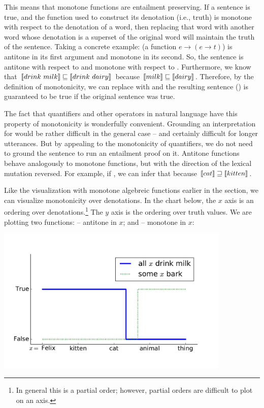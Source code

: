 This means that monotone functions are entailment preserving.
If a sentence is true, and the function used to construct its denotation (i.e., truth)
  is monotone with respect to the denotation of a word, then replacing that word with
  another word whose denotation is a superset of the original word will maintain
  the truth of the sentence.
Taking a concrete example:  (a function $e \rightarrow (e \rightarrow t)$)
  is antitone in its first argument and monotone in its second.
So, the sentence  is antitone with respect to  and
  monotone with respect to .
Furthermore, we know that 
  $\llbracket drink ~ milk\rrbracket \sqsubseteq \llbracket drink~dairy\rrbracket$
  because $\llbracket milk\rrbracket \sqsubseteq \llbracket dairy\rrbracket$.
Therefore, by the definition of monotonicity, we can replace  with
   and the resulting sentence ()
  is guaranteed to be true if the original sentence was true.

The fact that quantifiers and other operators in natural language have this
  property of monotonicity is wonderfully convenient.
Grounding an interpretation for  would be rather
  difficult in the general case -- and certainly difficult for longer utterances.
But by appealing to the monotonicity of quantifiers, we do not need to ground
  the sentence to run an entailment proof on it.
Antitone functions behave analogously to monotone functions, but with the 
  direction of the lexical mutation reversed.
For example, if , we can infer that 
   because 
  $\llbracket cat \rrbracket \sqsupseteq \llbracket kitten\rrbracket$.

Like the visualization with monotone algebreic functions earlier in the section,
  we can visualize monotonicity over denotations.
In the chart below, the $x$ axis is an ordering over denotations.\footnote{
    In general this is a partial order; however, partial orders are difficult
    to plot on an axis.
    }
The $y$ axis is the ordering over truth values.
We are plotting two functions:  -- antitone in $x$; and
   -- monotone in $x$:

\begin{center}
\includegraphics[height=7cm]{img/monotonicity_lex_all.pdf}
\end{center}

